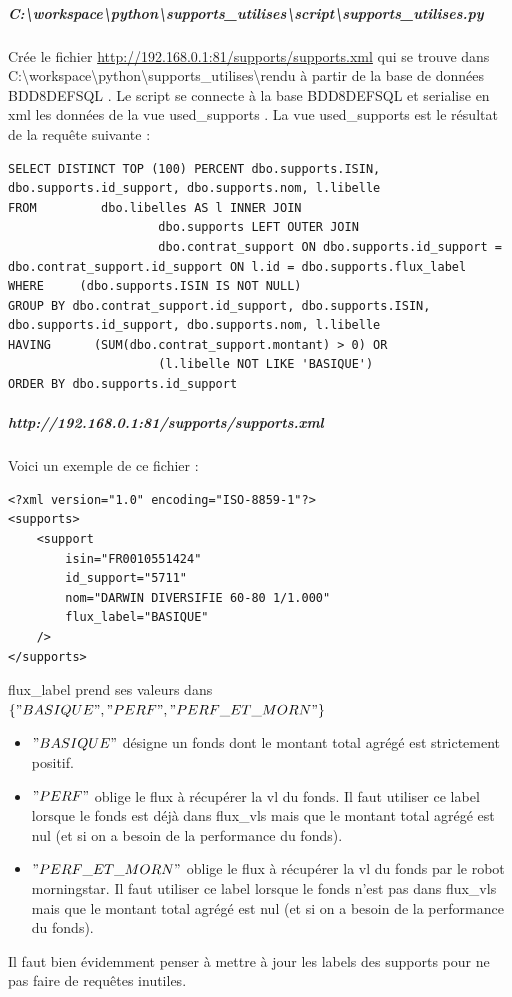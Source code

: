 \subparagraph{C:{\textbackslash}workspace{\textbackslash}python{\textbackslash}supports{\_}utilises{\textbackslash}script{\textbackslash}supports{\_}utilises.py\\}Crée le fichier \url{http://192.168.0.1:81/supports/supports.xml} qui se trouve dans C:{\textbackslash}workspace{\textbackslash}python{\textbackslash}supports{\_}utilises{\textbackslash}rendu à partir de la base de données {\og}BDD8DEFSQL{\fg} . Le script se connecte à la base {\og}BDD8DEFSQL{\fg}  et serialise en xml les données de la vue {\og}used{\_}supports{\fg} . La vue {\og}used{\_}supports{\fg}  est le résultat de la requ\^ete suivante : 
\begin{lstlisting}
SELECT DISTINCT TOP (100) PERCENT dbo.supports.ISIN,
dbo.supports.id_support, dbo.supports.nom, l.libelle
FROM         dbo.libelles AS l INNER JOIN
                     dbo.supports LEFT OUTER JOIN
                     dbo.contrat_support ON dbo.supports.id_support =
dbo.contrat_support.id_support ON l.id = dbo.supports.flux_label
WHERE     (dbo.supports.ISIN IS NOT NULL)
GROUP BY dbo.contrat_support.id_support, dbo.supports.ISIN,
dbo.supports.id_support, dbo.supports.nom, l.libelle
HAVING      (SUM(dbo.contrat_support.montant) > 0) OR
                     (l.libelle NOT LIKE 'BASIQUE')
ORDER BY dbo.supports.id_support
\end{lstlisting}

\subparagraph{\textbf{http://192.168.0.1:81/supports/supports.xml}\\}
Voici un exemple de ce fichier :\\
\begin{lstlisting}
<?xml version="1.0" encoding="ISO-8859-1"?>
<supports>
	<support 
		isin="FR0010551424" 
		id_support="5711" 
		nom="DARWIN DIVERSIFIE 60-80 1/1.000" 
		flux_label="BASIQUE"
	/>
</supports>
\end{lstlisting}
flux{\_}label prend ses valeurs dans $\lbrace "BASIQUE", "PERF", "PERF{\_}ET{\_}MORN"\rbrace $
\begin{itemize}
\item $"BASIQUE"$ désigne un fonds dont le montant total agrégé est strictement positif.
\item $"PERF"$ oblige le flux à récupérer la vl du fonds. Il faut utiliser ce label lorsque le fonds est déjà dans flux{\_}vls mais que le montant total agrégé est nul (et si on a besoin de la performance du fonds).
\item $"PERF{\_}ET{\_}MORN"$ oblige le flux à récupérer la vl du fonds par le robot morningstar. Il faut utiliser ce label lorsque le fonds n'est pas dans flux{\_}vls mais que le montant total agrégé est nul (et si on a besoin de la performance du fonds).
\end{itemize}
Il faut bien évidemment penser à mettre à jour les labels des supports pour ne pas faire de requ\^etes inutiles.


